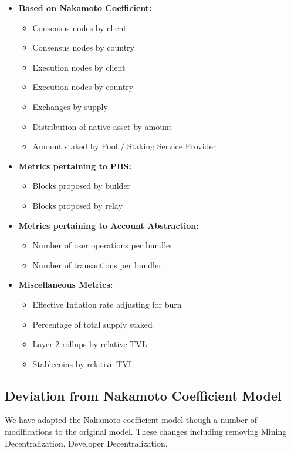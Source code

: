 \documentclass[conference]{IEEEtran}
\begin{document}
\begin{itemize}
   \item \textbf{Based on Nakamoto Coefficient:}
   \begin{itemize}
     \item Consensus nodes by client
     \item Consensus nodes by country
     \item Execution nodes by client
     \item Execution nodes by country
     \item Exchanges by supply
     \item Distribution of native asset by amount
     \item Amount staked by Pool / Staking Service Provider
   \end{itemize}
   \item \textbf{Metrics pertaining to PBS:}
   \begin{itemize}
       \item Blocks proposed by builder
       \item Blocks proposed by relay
   \end{itemize}
   \item \textbf{Metrics pertaining to Account Abstraction:}
   \begin{itemize}
       \item Number of user operations per bundler
       \item Number of transactions per bundler
   \end{itemize}
   \item \textbf{Miscellaneous Metrics:}
   \begin{itemize}
       \item Effective Inflation rate adjusting for burn
       \item Percentage of total supply staked
       \item Layer 2 rollups by relative TVL
       \item Stablecoins by relative TVL
   \end{itemize}
 \end{itemize}

\subsection{Deviation from Nakamoto Coefficient Model}

We have adapted the Nakamoto coefficient model though a number of modifications to the original model.  These changes including removing Mining Decentralization, Developer Decentralization. 
\end{document}
